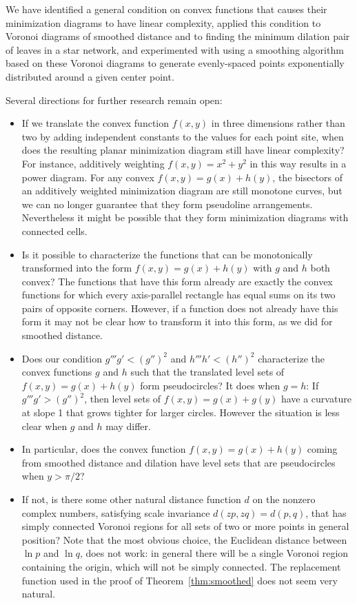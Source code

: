 \documentclass[10pt, conference, compsocconf]{IEEEtran}
\begin{document}
We have identified a general condition on convex functions that causes their minimization diagrams to have linear complexity, applied this condition to Voronoi diagrams of smoothed distance and to finding the minimum dilation pair of leaves in a star network, and experimented with using a smoothing algorithm based on these Voronoi diagrams to generate evenly-spaced points exponentially distributed around a given center point.

Several directions for further research remain open:

\begin{itemize}
\item If we translate the convex function $f(x,y)$ in three dimensions rather than two by adding independent constants to the values for each point site, when does the resulting planar minimization diagram still have linear complexity? For instance, additively weighting $f(x,y)=x^2+y^2$ in this way results in a power diagram. For any convex $f(x,y)=g(x)+h(y)$, the bisectors of an additively weighted minimization diagram are still monotone curves, but we can no longer guarantee that they form pseudoline arrangements. Nevertheless it might be possible that they form minimization diagrams with connected cells.
\item Is it possible to characterize the functions that can be monotonically transformed into the form $f(x,y)=g(x)+h(y)$ with $g$ and $h$ both convex? The functions that have this form already are exactly the convex functions for which every axis-parallel rectangle has equal sums on its two pairs of opposite corners. However, if a function does not already have this form it may not be clear how to transform it into this form, as we did for smoothed distance.
\item Does our condition $g'''g'<(g'')^2$ and $h'''h'<(h'')^2$ characterize the convex functions $g$ and $h$ such that the translated level sets of $f(x,y)=g(x)+h(y)$ form pseudocircles? It does when $g=h$: If $g'''g'>(g'')^2$, then level sets of $f(x,y)=g(x)+g(y)$ have a curvature at slope 1 that grows tighter for larger circles. However the situation is less clear when $g$ and $h$ may differ.
\item In particular, does the convex function $f(x,y)=g(x)+h(y)$ coming from smoothed distance and dilation have level sets that are pseudocircles when $y>\pi/2$?
\item If not, is there some other natural distance function $d$ on the nonzero complex numbers, satisfying scale invariance $d(zp,zq)=d(p,q)$, that has simply connected Voronoi regions for all sets of two or more points in general position? Note that the most obvious choice, the Euclidean distance between $\ln p$ and $\ln q$, does not work: in general there will be a single Voronoi region containing the origin, which will not be simply connected. The replacement function used in the proof of Theorem~\ref{thm:smoothed} does not seem very natural.

\end{itemize}
\end{document}
